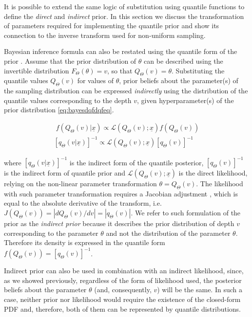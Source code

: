 \documentclass[
  12pt,
]{article}
\begin{document}
It is possible to extend the same logic of substitution using quantile functions to define the \emph{direct} and \emph{indirect} prior. In this section we discuss the transformation of parameters required for implementing the quantile prior and show its connection to the inverse transform used for non-uniform sampling.

Bayesian inference formula can also be restated using the quantile form of the prior \citep{nair2020BayesianInferenceQuantile}. Assume that the prior distribution of \(\theta\) can be described using the invertible distribution \(F_\Theta(\theta)=v\), so that \(Q_\Theta(v)=\theta\). Substituting the quantile values \(Q_\Theta(v)\) for values of \(\theta\), prior beliefs about the parameter(s) of the sampling distribution can be expressed \emph{indirectly} using the distribution of the quantile values corresponding to the depth \(v\), given hyperparameter(s) of the prior distribution \eqref{eq:bayesdqfdqfeq}.

\[
\begin{gathered}\;
f(Q_\Theta(v)|\underline{x}) \propto \mathcal{L}(Q_\Theta(v);\underline{x})f(Q_\Theta(v)) \\
[q_\Theta(v|\underline{x})]^{-1} \propto \mathcal{L}(Q_\Theta(v);\underline{x})[q_\Theta(v)]^{-1}
\end{gathered}
\label{eq:bayesdqfdqfeq}
\]

where \([q_\Theta(v|\underline{x})]^{-1}\) is the indirect form of the quantile posterior, \([q_\Theta(v)]^{-1}\) is the indirect form of quantile prior and \(\mathcal{L}(Q_\Theta(v);\underline{x})\) is the direct likelihood, relying on the non-linear parameter transformation \(\theta=Q_\Theta(v)\). The likelihood with such parameter transformation requires a Jacobian adjustment \citep{andrilli2010ElementaryLinearAlgebra}, which is equal to the absolute derivative of the transform, i.e.~\(J(Q_\Theta(v))=|dQ_\Theta(v)/dv|=|q_\Theta(v)|\). We refer to such formulation of the prior as the \emph{indirect prior} because it describes the prior distribution of depth \(v\) corresponding to the parameter \(\theta\) and not the distribution of the parameter \(\theta\). Therefore its density is expressed in the quantile form \(f(Q_\Theta(v))=[q_\Theta(v)]^{-1}\).

Indirect prior can also be used in combination with an indirect likelihood, since, as we showed previously, regardless of the form of likelihood used, the posterior beliefs about the parameter \(\theta\) (and, consequently, \(v\)) will be the same. In such a case, neither prior nor likelihood would require the existence of the closed-form PDF and, therefore, both of them can be represented by quantile distributions.
\end{document}
